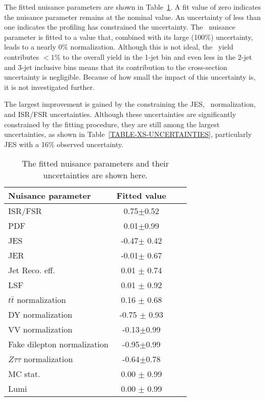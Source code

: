 The fitted nuisance parameters are shown in Table~\ref{TABLE-MEASUREMENT-FIT}. A fit value of zero indicates the nuisance parameter remains at the nominal value. An uncertainty of less than one indicates the profiling has constrained the uncertainty. The \multijet\ nuisance parameter is fitted to a value that, combined with its large (100\%) uncertainty, leads to a nearly 0\% normalization. Although this is not ideal, the \multijet\ yield contributes $< 1\%$ to the overall yield in the 1-jet bin and even less in the 2-jet and 3-jet inclusive bins means that its contribution to the cross-section uncertainty is negligible. Because of how small the impact of this uncertainty is, it is not investigated further. 

The largest improvement is gained by the constraining the JES, \ttbar\ normalization, and ISR/FSR uncertainties. Although these uncertainties are significantly constrained by the fitting procedure, they are still among the largest uncertainties, as shown in Table~\ref{TABLE-XS-UNCERTAINTIES}, particularly JES with a 16\% observed uncertainty.

\begin{table}[htdp]
\begin{center}
   \begin{tabular}{|l|c|l|c}
    \hline
 Nuisance parameter & Fitted value \\
    \hline \hline
 ISR/FSR &0.75$\pm$0.52             \\
 PDF &0.01$\pm$0.99                \\
\hline
 JES  & -0.47$\pm$ 0.42            \\
 JER  & -0.01$\pm$ 0.67            \\
 Jet Reco. eff.  & 0.01 $\pm$ 0.74 \\
 LSF  & 0.01 $\pm$ 0.92           \\
\hline
 $t\bar{t}$ normalization  & 0.16 $\pm$ 0.68        \\
 DY normalization    & -0.75 $\pm$ 0.93        \\
 VV normalization    &-0.13$\pm$0.99            \\
 Fake dilepton normalization  &-0.95$\pm$0.99         \\
 $Z\tau\tau$ normalization  &-0.64$\pm$0.78   \\
\hline
 MC stat. & 0.00 $\pm$ 0.99        \\
 Lumi & 0.00 $\pm$ 0.99           \\
    \hline
   \end{tabular}
 \caption{The fitted nuisance parameters and their uncertainties are shown here. }
\label{TABLE-MEASUREMENT-FIT}
\end{center}
\end{table}

